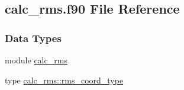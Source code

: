 \hypertarget{calc__rms_8f90}{\subsection{calc\-\_\-rms.\-f90 File Reference}
\label{calc__rms_8f90}
}
\subsubsection*{Data Types}
\begin{DoxyCompactItemize}
\item 
module \hyperlink{classcalc__rms}{calc\-\_\-rms}
\item 
type \hyperlink{structcalc__rms_1_1rms__coord__type}{calc\-\_\-rms\-::rms\-\_\-coord\-\_\-type}
\end{DoxyCompactItemize}
